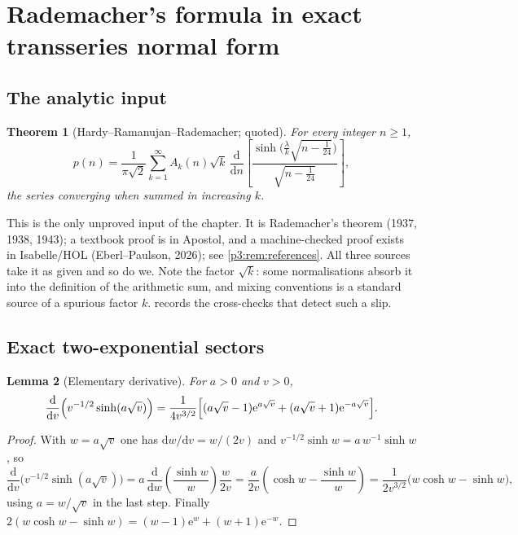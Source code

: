 \documentclass[11pt,a4paper,oneside]{book}
\theoremstyle{plain}
\newtheorem{theorem}{Theorem}[chapter]
\newtheorem{lemma}[theorem]{Lemma}
\theoremstyle{definition}
\theoremstyle{remark}
\newcommand{\e}{\mathrm{e}}
\newcommand{\dd}{\mathrm{d}}
\begin{document}
\section{Rademacher's formula in exact transseries normal form}
\label{p3:sec:exact}

\subsection{The analytic input}

\begin{theorem}[Hardy--Ramanujan--Rademacher; quoted]\label{p3:thm:rademacher}
For every integer $n\ge1$,
\begin{equation}\label{p3:eq:rademacher}
 p(n)=\frac1{\pi\sqrt2}\sum_{k=1}^{\infty}A_{k}(n)\sqrt k\,
 \frac{\dd}{\dd n}
 \left[\frac{\sinh\!\bigl(\tfrac{\lambda}{k}\sqrt{n-\tfrac1{24}}\bigr)}
 {\sqrt{n-\tfrac1{24}}}\right],
\end{equation}
the series converging when summed in increasing $k$.
\end{theorem}

This is the only unproved input of the chapter. It is Rademacher's theorem (1937, 1938, 1943); a
textbook proof is in Apostol, and a machine-checked proof exists in Isabelle/HOL (Eberl--Paulson,
2026); see \cref{p3:rem:references}. All three sources take it as given and so do we. Note the
factor $\sqrt k$: some normalisations absorb it into the definition of the arithmetic sum, and
mixing conventions is a standard source of a spurious factor $k$.
 records the cross-checks that detect such a slip.

\subsection{Exact two-exponential sectors}

\begin{lemma}[Elementary derivative]\label{p3:lem:derivative}
For $a>0$ and $v>0$,
\begin{equation}\label{p3:eq:derivative}
 \frac{\dd}{\dd v}\Bigl(v^{-1/2}\sinh(a\sqrt v)\Bigr)
 =\frac1{4v^{3/2}}
 \Bigl[(a\sqrt v-1)\e^{a\sqrt v}+(a\sqrt v+1)\e^{-a\sqrt v}\Bigr].
\end{equation}
\end{lemma}

\begin{proof}
With $w=a\sqrt v$ one has $\dd w/\dd v=w/(2v)$ and $v^{-1/2}\sinh w=a\,w^{-1}\sinh w$, so
\[
\frac{\dd}{\dd v}\bigl(v^{-1/2}\sinh(a\sqrt v)\bigr) =a\,\frac{\dd}{\dd w}\!\left(\frac{\sinh
w}{w}\right)\frac{w}{2v} =\frac{a}{2v}\left(\cosh w-\frac{\sinh w}{w}\right)
=\frac{1}{2v^{3/2}}\bigl(w\cosh w-\sinh w\bigr),
\]
using $a=w/\sqrt v$ in the last step. Finally $2(w\cosh w-\sinh w)=(w-1)\e^{w}+(w+1)\e^{-w}$.
\end{proof}
\end{document}
